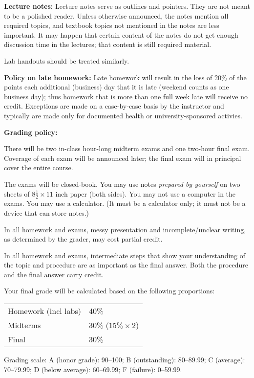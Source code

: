 \documentclass{article}
\begin{document}
\bigskip
\textbf{\large Lecture notes:}
Lecture notes serve as outlines and pointers.
They are not meant to be a polished reader.
Unless otherwise announced,
the notes mention all required topics,
and textbook topics not mentioned in the notes are less important.
It may happen that certain content of the notes
do not get enough discussion time in the lectures;
that content is still required material.

Lab handouts should be treated similarly.

\bigskip
\textbf{\large Policy on late homework:}
Late homework will result in the loss of 20\% of the points each additional
(business) day that it is late (weekend counts as one business day);
thus homework that is more than one full week late will receive no credit.
Exceptions are made
on a case-by-case basis by the instructor and typically are made only for
documented health or university-sponsored activies.


\bigskip
\textbf{\large Grading policy:}

There will be two in-class hour-long midterm exams
and one two-hour final exam.
Coverage of each exam will be announced later;
the final exam will in principal cover the entire course.

The exams will be closed-book. You may use notes \emph{prepared by
yourself} on
two sheets of $8 \frac{1}{2} \times 11$ inch paper (both sides).
You may not use a computer in the exams.
You may use a calculator.
(It must be a calculator only; it must not be a device that can store
notes.)

In all homework and exams,
messy presentation and incomplete/unclear writing, as determined by the
grader, may cost partial credit.

In all homework and exams,
intermediate steps that show your understanding
of the topic and procedure are as important as the final answer.
Both the procedure and the final answer carry credit.

Your final grade will be calculated based on the following proportions:

\hskip2cm
\begin{tabular}{ll}
Homework (incl labs) & 40\%\\
Midterms & 30\% ($15\% \times 2$)\\
Final & 30\%
\end{tabular}

Grading scale:
A (honor grade): 90--100;
B (outstanding): 80--89.99;
C (average): 70--79.99;
D (below average): 60--69.99;
F (failure): 0--59.99.
\end{document}
